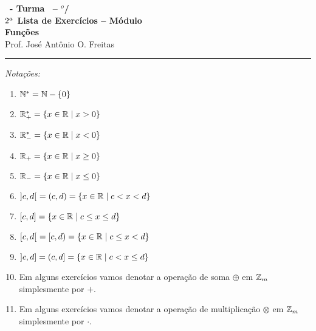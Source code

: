 \documentclass[12pt]{exam}
\begin{document}
    \begin{center}
    {\Large\bf \disciplina\ - Turma \turma\ -- \semestre$^{o}$/\ano} \\ \vspace{9pt} {\large\bf
        $2^a$ Lista de Exercícios -- Módulo \numeromodulo\\ Funções}\\ \vspace{9pt} Prof. José Antônio O. Freitas
    \end{center}
    \hrule

    \vspace{.6cm}

\begin{center}
    \textit{Notações:}
\end{center}
\begin{multicols}{2}
    \begin{enumerate}[label={\roman*})]
        \item $\mathbb{N}^* = \mathbb{N} - \{0\}$

        \item $\mathbb{R}^*_+ = \{x \in \mathbb{R} \mid x > 0\}$

        \item $\mathbb{R}^*_- = \{x \in \mathbb{R} \mid x < 0\}$

        \item $\mathbb{R}_+ = \{x \in \mathbb{R} \mid x \ge 0\}$

        \item $\mathbb{R}_- = \{x \in \mathbb{R} \mid x \le 0\}$

        \item $]c,d[\ = (c,d) = \{x \in \mathbb{R} \mid c < x < d\}$

        \item $[c,d] = \{x \in \mathbb{R} \mid c \le x \le d\}$

        \item $[c,d[\ = [c, d) = \{x \in \mathbb{R} \mid c \le x < d\}$

        \item $]c,d] = (c, d] = \{x \in \mathbb{R} \mid c < x \le d\}$

        \item Em alguns exercícios vamos denotar a operação de soma $\oplus$ em $\mathbb{Z}_m$ simplesmente por $+$.

        \item Em alguns exercícios vamos denotar a operação de multiplicação $\otimes$ em $\mathbb{Z}_m$ simplesmente por $\cdot$.

    \end{enumerate}
\end{multicols}
\end{document}
